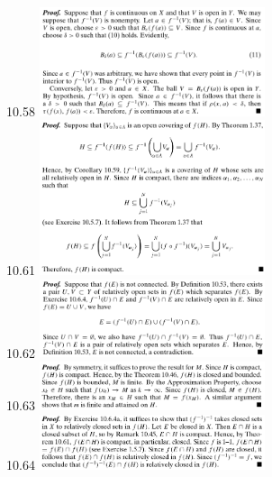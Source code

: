 \documentclass[3pt,landscape]{article}
\begin{document}
\begin{multicols}{3}
    10.58
    \includegraphics[width=250]{10_58.png} \\
    10.61
    \includegraphics[width=250]{10_61.png} \\
    10.62
    \includegraphics[width=250]{10_62.png} \\
    10.63
    \includegraphics[width=250]{10_63.png} \\
    10.64
    \includegraphics[width=250]{10_64.png} \\
\end{multicols}
\end{document}

